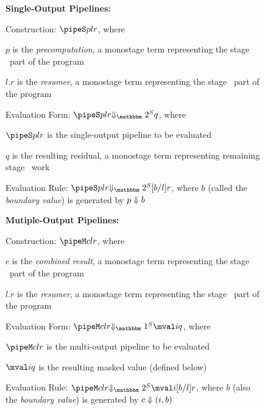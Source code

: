 \begin{figure*}
\begin{abstrsyn}

\textbf{Single-Output Pipelines:}

\hspace{2em} Construction: $\pipeS p l r$, where 
	
	\hspace{4em} $p$ is the {\em precomputation}, a monostage term representing the stage \bbone\ part of the program
	
	\hspace{4em} $l.r$ is the {\em resumer}, a monostage term representing the stage \bbtwo\ part of the program

\hspace{2em} Evaluation Form: $\sepredtwo {\pipeS p l r} q$, where 
	
	\hspace{4em} $\pipeS p l r$ is the single-output pipeline to be evaluated 
	
	\hspace{4em} $q$ is the resulting residual, a monostage term representing remaining stage \bbtwo\ work

\hspace{2em} Evaluation Rule: $\sepredtwo {\pipeS p l r} {[b/l]r}$, where $b$ (called the {\em boundary value}) is generated by ${p} \Downarrow {b}$

\textbf{Mutiple-Output Pipelines:}

\hspace{2em} Construction: $\pipeM c l r$, where 
	
	\hspace{4em} $c$ is the {\em combined result}, a monostage term representing the stage \bbone\ part of the program
	
	\hspace{4em} $l.r$ is the {\em resumer}, a monostage term representing the stage \bbtwo\ part of the program

\hspace{2em} Evaluation Form: $\sepredone {\pipeM c l r} {\mval i q}$, where 
	
	\hspace{4em} $\pipeM c l r$ is the multi-output pipeline to be evaluated
	
	\hspace{4em} $\mval i q$ is the resulting masked value (defined below)

\hspace{2em} Evaluation Rule: $\sepredtwo {\pipeM c l r} {\mval i {[b/l]r}}$, where $b$ (also the {\em boundary value}) is generated by ${c} \Downarrow {(}i,b)$


\end{abstrsyn}
\end{figure*}
